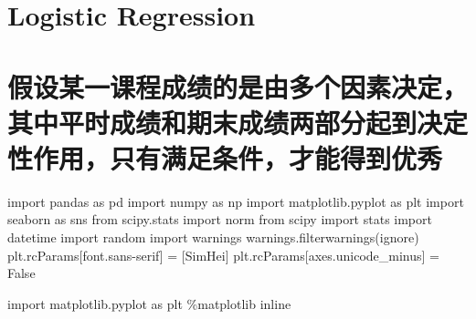 \documentclass[
]{article}
\author{}
\date{}
\newenvironment{Shaded}{}{}
\newcommand{\ImportTok}[1]{#1}
\newcommand{\NormalTok}[1]{#1}
\newcommand{\OperatorTok}[1]{\textcolor[rgb]{0.40,0.40,0.40}{#1}}
\newcommand{\StringTok}[1]{\textcolor[rgb]{0.25,0.44,0.63}{#1}}
\newcommand{\VariableTok}[1]{\textcolor[rgb]{0.10,0.09,0.49}{#1}}
\begin{document}
\hypertarget{logistic-regression}{%
\section{Logistic Regression}\label{logistic-regression}}

\hypertarget{ux5047ux8bbeux67d0ux4e00ux8bfeux7a0bux6210ux7ee9ux7684ux662fux7531ux591aux4e2aux56e0ux7d20ux51b3ux5b9aux5176ux4e2dux5e73ux65f6ux6210ux7ee9ux548cux671fux672bux6210ux7ee9ux4e24ux90e8ux5206ux8d77ux5230ux51b3ux5b9aux6027ux4f5cux7528ux53eaux6709ux6ee1ux8db3ux6761ux4ef6ux624dux80fdux5f97ux5230ux4f18ux79c0}{%
\section{假设某一课程成绩的是由多个因素决定，其中平时成绩和期末成绩两部分起到决定性作用，只有满足条件，才能得到优秀}\label{ux5047ux8bbeux67d0ux4e00ux8bfeux7a0bux6210ux7ee9ux7684ux662fux7531ux591aux4e2aux56e0ux7d20ux51b3ux5b9aux5176ux4e2dux5e73ux65f6ux6210ux7ee9ux548cux671fux672bux6210ux7ee9ux4e24ux90e8ux5206ux8d77ux5230ux51b3ux5b9aux6027ux4f5cux7528ux53eaux6709ux6ee1ux8db3ux6761ux4ef6ux624dux80fdux5f97ux5230ux4f18ux79c0}}

\begin{Shaded}
\begin{Highlighting}[]
\ImportTok{import}\NormalTok{ pandas }\ImportTok{as}\NormalTok{ pd}
\ImportTok{import}\NormalTok{ numpy }\ImportTok{as}\NormalTok{ np}
\ImportTok{import}\NormalTok{ matplotlib.pyplot }\ImportTok{as}\NormalTok{ plt}
\ImportTok{import}\NormalTok{ seaborn }\ImportTok{as}\NormalTok{ sns}
\ImportTok{from}\NormalTok{ scipy.stats }\ImportTok{import}\NormalTok{ norm}
\ImportTok{from}\NormalTok{ scipy }\ImportTok{import}\NormalTok{ stats}
\ImportTok{import}\NormalTok{ datetime}
\ImportTok{import}\NormalTok{ random}
\ImportTok{import}\NormalTok{ warnings}
\NormalTok{warnings.filterwarnings(}\StringTok{\textquotesingle{}ignore\textquotesingle{}}\NormalTok{)}
\NormalTok{plt.rcParams[}\StringTok{\textquotesingle{}font.sans{-}serif\textquotesingle{}}\NormalTok{] }\OperatorTok{=}\NormalTok{ [}\StringTok{\textquotesingle{}SimHei\textquotesingle{}}\NormalTok{]}
\NormalTok{plt.rcParams[}\StringTok{\textquotesingle{}axes.unicode\_minus\textquotesingle{}}\NormalTok{] }\OperatorTok{=} \VariableTok{False}

\ImportTok{import}\NormalTok{ matplotlib.pyplot }\ImportTok{as}\NormalTok{ plt}
\OperatorTok{\%}\NormalTok{matplotlib inline}
\end{Highlighting}
\end{Shaded}
\end{document}

